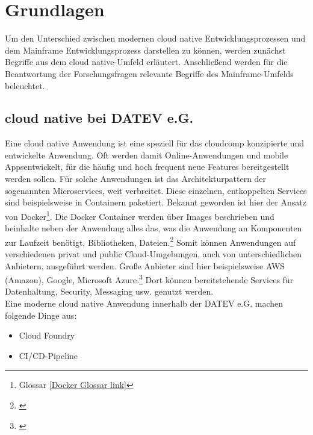 \chapter{Grundlagen}\label{ch:grundlagen}
Um den Unterschied zwischen modernen cloud native Entwicklungsprozessen und dem Mainframe Entwicklungsprozess darstellen zu können, werden zunächst Begriffe aus dem cloud native-Umfeld erläutert.
Anschließend werden für die Beantwortung der Forschungsfragen relevante Begriffe des Mainframe-Umfelds beleuchtet.

\section{cloud native bei DATEV e.G.}\label{sec:cloudnative}
Eine cloud native Anwendung ist eine speziell für das \Gls{cloudcomp} konzipierte und entwickelte Anwendung.
Oft werden damit Online-Anwendungen und mobile \glqq Apps\grqq entwickelt, für die häufig und hoch frequent neue Features bereitgestellt werden sollen. 
Für solche Anwendungen ist das Architekturpattern der sogenannten \glqq Microservices\grqq, weit verbreitet.
Diese einzelnen, entkoppelten Services sind beispielsweise in Containern paketiert. 
Bekannt geworden ist hier der Ansatz von Docker\footnote{Glossar \ref{Docker Glossar link}}.
Die Docker Container werden über Images beschrieben und beinhalte neben der Anwendung alles das, was die Anwendung an Komponenten zur Laufzeit benötigt, Bibliotheken, Dateien.\footnote{\cite{Vohra.2016}}
Somit können Anwendungen auf verschiedenen \glqq privat\grqq{} und \glqq public\grqq{} Cloud-Umgebungen, auch von unterschiedlichen Anbietern, ausgeführt werden.
Große Anbieter sind hier beispielsweise AWS (Amazon), Google, Microsoft Azure.\footnote{\cite{.27.2.2020}}
Dort können bereitstehende Services für Datenhaltung, Security, Messaging usw. genutzt werden. 
\cite{.23.2.2020d}\\
Eine moderne cloud native Anwendung innerhalb der DATEV e.G. machen folgende Dinge aus:
\begin{itemize}
\item \glqq Cloud Foundry\grqq
\item CI/CD-Pipeline
\end{itemize}

